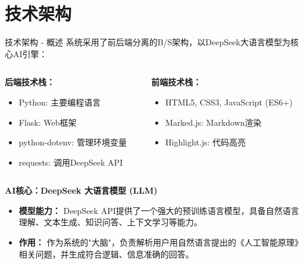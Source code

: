 \documentclass{beamer}
\begin{document}
\section{技术架构}
\begin{frame}{技术架构 - 概述}
  系统采用了前后端分离的B/S架构，以DeepSeek大语言模型为核心AI引擎：
  \begin{columns}[T] %
    \begin{column}{0.5\textwidth}
      \textbf{后端技术栈：}
      \begin{itemize}
        \item Python: 主要编程语言
        \item Flask: Web框架
        \item python-dotenv: 管理环境变量
        \item requests: 调用DeepSeek API
      \end{itemize}
    \end{column}
    \begin{column}{0.5\textwidth}
      \textbf{前端技术栈：}
      \begin{itemize}
        \item HTML5, CSS3, JavaScript (ES6+)
        \item Marked.js: Markdown渲染
        \item Highlight.js: 代码高亮
      \end{itemize}
    \end{column}
  \end{columns}
  \vspace{1em}
  \begin{block}{\textbf{AI核心：DeepSeek 大语言模型 (LLM)}}
    \begin{itemize}
        \item \textbf{模型能力：} DeepSeek API提供了一个强大的预训练语言模型，具备自然语言理解、文本生成、知识问答、上下文学习等能力。
        \item \textbf{作用：} 作为系统的"大脑"，负责解析用户用自然语言提出的《人工智能原理》相关问题，并生成符合逻辑、信息准确的回答。
    \end{itemize}
  \end{block}
\end{frame}

\end{document}
